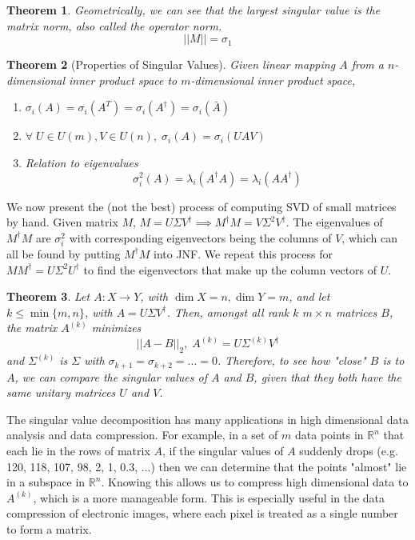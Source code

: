 \documentclass{article}
\newtheorem{theorem}{Theorem}[section]
\theoremstyle{remark}
\theoremstyle{definition}
\begin{document}
\begin{theorem}
Geometrically, we can see that the largest singular value is the matrix norm, also called the operator norm. 
\[||M|| = \sigma_1\]
\end{theorem}

\begin{theorem}[Properties of Singular Values] Given linear mapping $A$ from a $n$-dimensional inner product space to $m$-dimensional inner product space, 
\begin{enumerate}
    \item $\sigma_i(A) = \sigma_i (A^T) = \sigma_i (A^\dagger) = \sigma_i (\bar{A})$
    \item $\forall \; U \in U(m), V \in U(n), \; \sigma_i (A) = \sigma_i (U A V)$
    \item Relation to eigenvalues
\[\sigma_i^2(A) = \lambda_i (A^\dagger A) = \lambda_i (A A^\dagger)\]
\end{enumerate}
\end{theorem}

We now present the (not the best) process of computing SVD of small matrices by hand. Given matrix $M$, $M = U \Sigma V^\dagger \implies M^\dagger M = V \Sigma^2 V^\dagger$. The eigenvalues of $M^\dagger M$ are $\sigma_i^2$ with corresponding eigenvectors being the columns of $V$, which can all be found by putting $M^\dagger M$ into JNF. We repeat this process for $M M^\dagger = U \Sigma^2 U^\dagger$ to find the eigenvectors that make up the column vectors of $U$. 

\begin{theorem}
Let $A: X \longrightarrow Y$, with $\dim{X} = n, \dim{Y} = m$, and let $k \leq \min{\{m, n\}}$, with $A = U \Sigma V^\dagger$. Then, amongst all rank $k$ $m \times n$ matrices $B$, the matrix $A^{(k)}$ minimizes 
\[||A-B||_2, \; A^{(k)} = U \Sigma^{(k)} V^\dagger\]
and $\Sigma^{(k)}$ is $\Sigma$ with $\sigma_{k+1} = \sigma_{k+2} = ... = 0$. Therefore, to see how "close" $B$ is to $A$, we can compare the singular values of $A$ and $B$, given that they both have the same unitary matrices $U$ and $V$. 
\end{theorem}

The singular value decomposition has many applications in high dimensional data analysis and data compression. For example, in a set of $m$ data points in $\mathbb{R}^n$ that each lie in the rows of matrix $A$, if the singular values of $A$ suddenly drops (e.g. 120, 118, 107, 98, 2, 1, 0.3, ...) then we can determine that the points "almost" lie in a subspace in $\mathbb{R}^n$. Knowing this allows us to compress high dimensional data to $A^{(k)}$, which is a more manageable form. This is especially useful in the data compression of electronic images, where each pixel is treated as a single number to form a matrix. 
\end{document}
